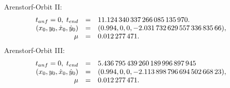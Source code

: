 \documentclass[12pt,a4paper,twoside,leqno]{article}
\begin{document}
%
{\sc Arenstorf}-Orbit II:
\[
\ba{.}{rcl}
t_{anf} = 0, \;
t_{end} &=& 11.124 \, 340 \, 337 \, 266 \, 085 \, 135 \, 970.\\
(x_0, y_0, \dot{x}_0, \dot{y}_0) &=& (0.994, 0 , 0, -2.031 \, 732 \, 629 \, 557
\, 336 \, 835 \, 66),\\
\mu  &=& 0.012 \, 277 \, 471.
\ea{.}
\]
{\sc Arenstorf}-Orbit III:
\[
\ba{.}{rcl}
t_{anf} = 0, \;
t_{end} &=& 5.436 \, 795 \, 439 \, 260 \, 189 \, 996 \, 897 \, 945\\
(x_0, y_0, \dot{x}_0, \dot{y}_0) &=& (0.994, 0, 0, -2.113 \, 898 \, 796 \, 694
\, 502 \, 668 \, 23),\\
\mu  &=& 0.012 \, 277 \, 471.
\ea{.}
\]
\end{document}
